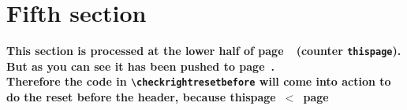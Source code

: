 \documentclass{article}
\newcounter{thispage}
\begin{document}
\vspace{2cm}

\section{Fifth section}
\label{sec:push}

{\bfseries This section is processed at the lower half of  page~\thethispage\ (counter \texttt{thispage}). But as you can see it has been pushed to page~\pageref{sec:push}.\\
Therefore the code in \verb|\checkrightresetbefore| will come into action to do the reset before the header, because \mbox{thispage $<$ page}}

\medskip

\lipsum[1-6]
\end{document}

